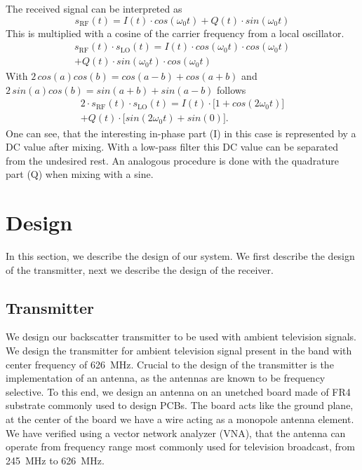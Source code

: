\documentclass[conference]{IEEEtran}
\begin{document}
The received signal can be interpreted as
\begin{equation}
	s_{\text{RF}}(t)=I(t) \cdot cos(\omega_{0}t) + Q(t) \cdot sin(\omega_{0}t)
\end{equation}     
This is multiplied with a cosine of the carrier frequency from a local oscillator.
\begin{multline}
        s_{\text{RF}}(t) \cdot s_{\text{LO}}(t) = I(t) \cdot cos(\omega_{0}t) \cdot cos(\omega_{0}t)\\+ Q(t) \cdot sin(\omega_{0}t) \cdot cos(\omega_{0}t)
\end{multline}
With \ensuremath{2\,cos(a)cos(b)=cos(a-b)+cos(a+b)} and \ensuremath{2\,sin(a)cos(b)=sin(a+b)+sin(a-b)} follows
\begin{multline}
        2 \cdot s_{\text{RF}}(t) \cdot s_{\text{LO}}(t) = I(t) \cdot \bigl[1+cos(2\omega_{0}t)\bigr]\\+ Q(t) \cdot \bigl[sin(2\omega_0t)+sin(0)\bigr].
\end{multline}
One can see, that the interesting in-phase part (I) in this case is
represented by a DC value after mixing. With a low-pass filter this DC
value can be separated from the undesired rest. An analogous procedure
is done with the quadrature part (Q) when mixing with a sine.

\section{Design}
In this section, we describe the design 
of our system. We first describe the
design of the transmitter, next we describe 
the design of the receiver.

\subsection{Transmitter}
 
We design our backscatter transmitter to be used with ambient
television signals.  We design the transmitter for ambient
television signal present in the band with  
center frequency of \SI{626}{\mega\hertz}. Crucial to the design
of the transmitter is the implementation of an antenna, as
the antennas are known to be  frequency selective. To this end, we design an
antenna on an unetched board made of FR4 substrate commonly
used to design PCBs. The board acts like the ground plane, at the center
of the board we have a wire acting as a monopole antenna element. 
We have verified using a vector network analyzer (VNA), that the antenna
can operate from frequency range most commonly
used for television broadcast, 
from \SI{245}{\mega\hertz} to \SI{626}{\mega\hertz}.
\end{document}
